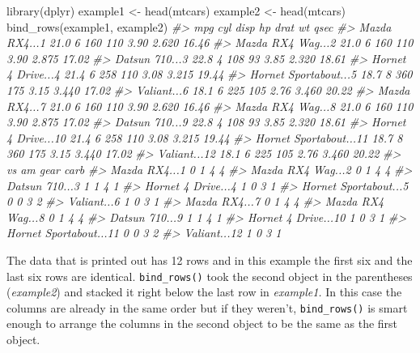 \documentclass[
]{krantz}
\makeatletter
\newenvironment{Shaded}{\begin{snugshade}}{\end{snugshade}}
\newcommand{\CommentTok}[1]{\textcolor[rgb]{0.37,0.37,0.37}{\textit{#1}}}
\newcommand{\FunctionTok}[1]{\textcolor[rgb]{0,0,0}{#1}}
\newcommand{\NormalTok}[1]{#1}
\newcommand{\OtherTok}[1]{\textcolor[rgb]{0.37,0.37,0.37}{#1}}
\newenvironment{kframe}{%
\medskip{}
\setlength{\fboxsep}{.8em}
 \def\at@end@of@kframe{}%
 \ifinner\ifhmode%
  \def\at@end@of@kframe{\end{minipage}}%
  \begin{minipage}{\columnwidth}%
 \fi\fi%
 \def\FrameCommand##1{\hskip\@totalleftmargin \hskip-\fboxsep
 \colorbox{shadecolor}{##1}\hskip-\fboxsep
     \hskip-\linewidth \hskip-\@totalleftmargin \hskip\columnwidth}%
 \MakeFramed {\advance\hsize-\width
   \@totalleftmargin\z@ \linewidth\hsize
   \@setminipage}}%
 {\par\unskip\endMakeFramed%
 \at@end@of@kframe}
\renewenvironment{Shaded}{\begin{kframe}}{\end{kframe}}
\makeatother
\begin{document}
\begin{Shaded}
\begin{Highlighting}[]
\FunctionTok{library}\NormalTok{(dplyr)}
\NormalTok{example1 }\OtherTok{\textless{}{-}} \FunctionTok{head}\NormalTok{(mtcars)}
\NormalTok{example2 }\OtherTok{\textless{}{-}} \FunctionTok{head}\NormalTok{(mtcars)}
\FunctionTok{bind\_rows}\NormalTok{(example1, example2)}
\CommentTok{\#\textgreater{}                         mpg cyl disp  hp drat    wt  qsec}
\CommentTok{\#\textgreater{} Mazda RX4...1          21.0   6  160 110 3.90 2.620 16.46}
\CommentTok{\#\textgreater{} Mazda RX4 Wag...2      21.0   6  160 110 3.90 2.875 17.02}
\CommentTok{\#\textgreater{} Datsun 710...3         22.8   4  108  93 3.85 2.320 18.61}
\CommentTok{\#\textgreater{} Hornet 4 Drive...4     21.4   6  258 110 3.08 3.215 19.44}
\CommentTok{\#\textgreater{} Hornet Sportabout...5  18.7   8  360 175 3.15 3.440 17.02}
\CommentTok{\#\textgreater{} Valiant...6            18.1   6  225 105 2.76 3.460 20.22}
\CommentTok{\#\textgreater{} Mazda RX4...7          21.0   6  160 110 3.90 2.620 16.46}
\CommentTok{\#\textgreater{} Mazda RX4 Wag...8      21.0   6  160 110 3.90 2.875 17.02}
\CommentTok{\#\textgreater{} Datsun 710...9         22.8   4  108  93 3.85 2.320 18.61}
\CommentTok{\#\textgreater{} Hornet 4 Drive...10    21.4   6  258 110 3.08 3.215 19.44}
\CommentTok{\#\textgreater{} Hornet Sportabout...11 18.7   8  360 175 3.15 3.440 17.02}
\CommentTok{\#\textgreater{} Valiant...12           18.1   6  225 105 2.76 3.460 20.22}
\CommentTok{\#\textgreater{}                        vs am gear carb}
\CommentTok{\#\textgreater{} Mazda RX4...1           0  1    4    4}
\CommentTok{\#\textgreater{} Mazda RX4 Wag...2       0  1    4    4}
\CommentTok{\#\textgreater{} Datsun 710...3          1  1    4    1}
\CommentTok{\#\textgreater{} Hornet 4 Drive...4      1  0    3    1}
\CommentTok{\#\textgreater{} Hornet Sportabout...5   0  0    3    2}
\CommentTok{\#\textgreater{} Valiant...6             1  0    3    1}
\CommentTok{\#\textgreater{} Mazda RX4...7           0  1    4    4}
\CommentTok{\#\textgreater{} Mazda RX4 Wag...8       0  1    4    4}
\CommentTok{\#\textgreater{} Datsun 710...9          1  1    4    1}
\CommentTok{\#\textgreater{} Hornet 4 Drive...10     1  0    3    1}
\CommentTok{\#\textgreater{} Hornet Sportabout...11  0  0    3    2}
\CommentTok{\#\textgreater{} Valiant...12            1  0    3    1}
\end{Highlighting}
\end{Shaded}

The data that is printed out has 12 rows and in this example
the first six and the last six rows are identical.
\texttt{bind\_rows()} took the second object in the
parentheses (\emph{example2}) and stacked it right below the
last row in \emph{example1.} In this case the columns are
already in the same order but if they weren't,
\texttt{bind\_rows()} is smart enough to arrange the columns
in the second object to be the same as the first object.
\end{document}
